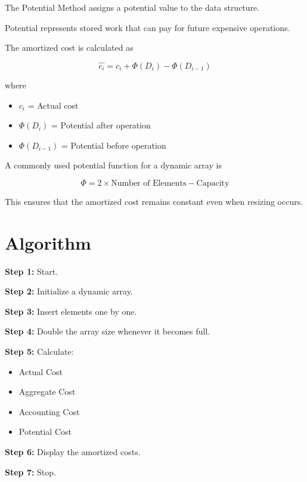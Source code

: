 \documentclass[12pt,a4paper]{article}
\begin{document}
The Potential Method assigns a potential value to the data structure.

Potential represents stored work that can pay for future expensive operations.

The amortized cost is calculated as

\[
\hat{c_i}
=
c_i
+
\Phi(D_i)
-
\Phi(D_{i-1})
\]

where

\begin{itemize}
\item $c_i$ = Actual cost
\item $\Phi(D_i)$ = Potential after operation
\item $\Phi(D_{i-1})$ = Potential before operation
\end{itemize}

A commonly used potential function for a dynamic array is

\[
\Phi = 2 \times \text{Number of Elements}
-
\text{Capacity}
\]

This ensures that the amortized cost remains constant even when resizing occurs.


\section*{Algorithm}

\textbf{Step 1:} Start.

\textbf{Step 2:} Initialize a dynamic array.

\textbf{Step 3:} Insert elements one by one.

\textbf{Step 4:} Double the array size whenever it becomes full.

\textbf{Step 5:} Calculate:

\begin{itemize}
\item Actual Cost
\item Aggregate Cost
\item Accounting Cost
\item Potential Cost
\end{itemize}

\textbf{Step 6:} Display the amortized costs.

\textbf{Step 7:} Stop.
\end{document}
